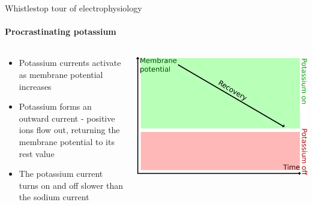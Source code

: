 \documentclass[aspectratio=169]{beamer}
\begin{document}
\begin{frame}[label={sec:org87685ef}]{Whistlestop tour of electrophysiology}
\framesubtitle{Procrastinating potassium}

\begin{columns}
\begin{column}{0.6\columnwidth}
\begin{itemize}
\item Potassium currents activate as membrane potential increases
\item Potassium forms an outward current - positive ions flow out, returning the membrane potential to its rest value
\item The potassium current turns on and off slower than the sodium current
\end{itemize}
\end{column}

\begin{column}{0.4\columnwidth}
\begin{center}
\includegraphics[width=.9\linewidth]{./slowpotassium.png}
\end{center}
\end{column}
\end{columns}
\end{frame}
\end{document}
